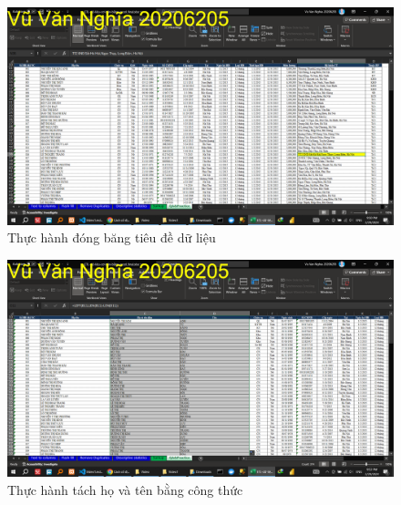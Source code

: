 \documentclass{article}
\begin{document}
\begin{figure}[h]
\centering
\includegraphics[scale = 0.15]{Video1/ThucHanh/2.png}
\caption{Thực hành đóng băng tiêu đề dữ liệu}
\end{figure}

\begin{figure}[h]
\centering
\includegraphics[scale = 0.15]{Video1/ThucHanh/3.png}
\caption{Thực hành tách họ và tên bằng công thức}
\end{figure}
\end{document}

